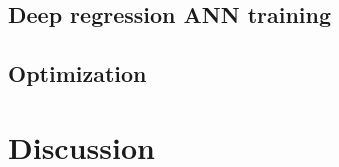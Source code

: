         \subsection{Deep regression ANN training}   \label{Chapter:RSM/LTFM/ANN training}
        
        
        \subsection{Optimization}                   \label{Chapter:RSM/LTFM/Optimization}
    
    
    
    \section{Discussion}                            \label{Chapter:RSM/discussion}
    
